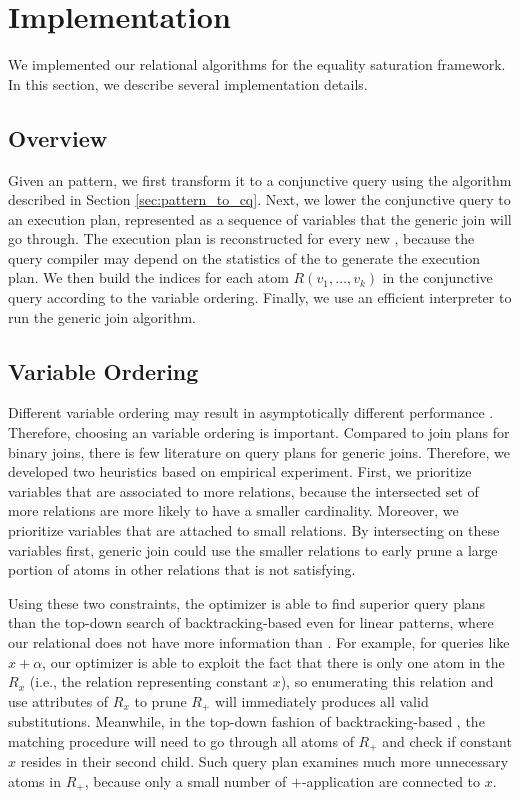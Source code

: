 \chapter{Implementation}

We implemented our relational \ematching algorithms for the \egg equality saturation framework. In this section, we describe several implementation details. 

\section{Overview}
Given an \ematching pattern, we first transform it to a conjunctive query using the algorithm described in Section \ref{sec:pattern_to_cq}. Next, we lower the conjunctive query to an execution plan, represented as a sequence of variables that the generic join will go through. The execution plan is reconstructed for every new \egraph, because the query compiler may depend on the statistics of the \egraph to generate the execution plan. We then build the indices for each atom $R(v_1,\ldots,v_k)$ in the conjunctive query according to the variable ordering. Finally, we use an efficient interpreter to run the generic join algorithm.

\section{Variable Ordering}

Different variable ordering may result in asymptotically different performance \citep{eval-wcoj, emptyheaded}. 
Therefore, choosing an variable ordering is important. 
Compared to join plans for binary joins, there is few literature on query plans for generic joins.
Therefore, we developed two heuristics based on empirical experiment. 
First, we prioritize variables that are associated to more relations, because the intersected set of more relations are more likely to have a smaller cardinality. 
Moreover, we prioritize variables that are attached to small relations. 
By intersecting on these variables first, generic join could use the smaller relations to early prune a large portion of atoms in other relations that is not satisfying. 

Using these two constraints, the optimizer is able to find superior query plans than the top-down search of backtracking-based \ematching even for linear patterns, where our relational \ematching does not have more information than \ematching. 
For example, for queries like $x+\alpha$, our optimizer is able to exploit the fact that there is only one atom in the $R_x$ (i.e., the relation representing constant $x$), so enumerating this relation and use attributes of $R_x$ to prune $R_+$ will immediately produces all valid substitutions. Meanwhile, in the top-down fashion of backtracking-based \ematching, the matching procedure will need to go through all atoms of $R_+$ and check if constant $x$ resides in their second child. Such query plan examines much more unnecessary atoms in $R_+$, because only a small number of $+$-application \enodes are connected to $x$.

